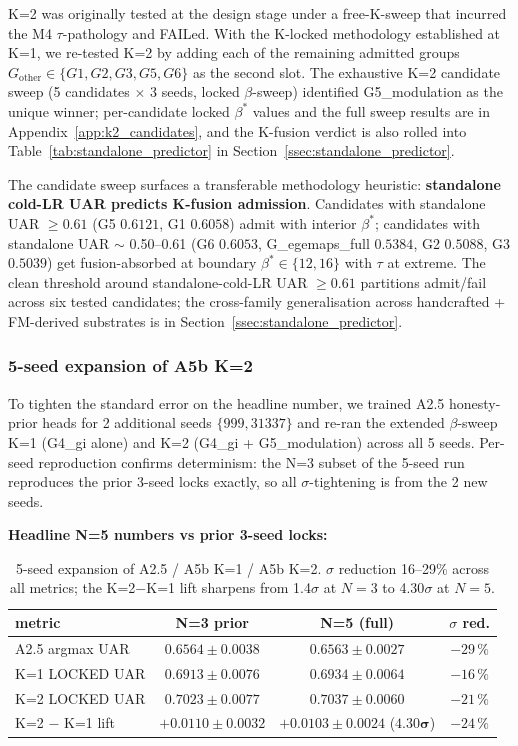 K=2 was originally tested at the design stage under a free-K-sweep that incurred the M4 $\tau$-pathology and FAILed. With the K-locked methodology established at K=1, we re-tested K=2 by adding each of the remaining admitted groups $G_{\text{other}} \in \{G1, G2, G3, G5, G6\}$ as the second slot. The exhaustive K=2 candidate sweep (5 candidates $\times$ 3 seeds, locked $\beta$-sweep) identified G5\_modulation as the unique winner; per-candidate locked $\beta^*$ values and the full sweep results are in Appendix~\ref{app:k2_candidates}, and the K-fusion verdict is also rolled into Table~\ref{tab:standalone_predictor} in Section~\ref{ssec:standalone_predictor}.

The candidate sweep surfaces a transferable methodology heuristic: \textbf{standalone cold-LR UAR predicts K-fusion admission}. Candidates with standalone UAR $\geq 0.61$ (G5 $0.6121$, G1 $0.6058$) admit with interior $\beta^*$; candidates with standalone UAR $\sim$ 0.50--0.61 (G6 $0.6053$, G\_egemaps\_full $0.5384$, G2 $0.5088$, G3 $0.5039$) get fusion-absorbed at boundary $\beta^* \in \{12, 16\}$ with $\tau$ at extreme. The clean threshold around standalone-cold-LR UAR $\geq 0.61$ partitions admit/fail across six tested candidates; the cross-family generalisation across handcrafted + FM-derived substrates is in Section~\ref{ssec:standalone_predictor}.

\subsubsection{5-seed expansion of A5b K=2}
\label{ssec:k2_5seed}

To tighten the standard error on the headline number, we trained A2.5 honesty-prior heads for 2 additional seeds $\{999, 31337\}$ and re-ran the extended $\beta$-sweep K=1 (G4\_gi alone) and K=2 (G4\_gi + G5\_modulation) across all 5 seeds. Per-seed reproduction confirms determinism: the N=3 subset of the 5-seed run reproduces the prior 3-seed locks exactly, so all $\sigma$-tightening is from the 2 new seeds.

\textbf{Headline N=5 numbers vs prior 3-seed locks:}

\begin{table}[t]
\centering\small
\caption{5-seed expansion of A2.5 / A5b K=1 / A5b K=2. $\sigma$ reduction 16--29\% across all metrics; the K=2$-$K=1 lift sharpens from 1.4$\sigma$ at $N{=}3$ to 4.30$\sigma$ at $N{=}5$.}
\label{tab:5seed}
\begin{tabular}{lccc}
\toprule
metric              & N=3 prior        & N=5 (full)        & $\sigma$ red. \\
\midrule
A2.5 argmax UAR     & $0.6564 \pm 0.0038$ & $0.6563 \pm 0.0027$ & $-29\,\%$ \\
K=1 LOCKED UAR      & $0.6913 \pm 0.0076$ & $0.6934 \pm 0.0064$ & $-16\,\%$ \\
K=2 LOCKED UAR      & $0.7023 \pm 0.0077$ & $\mathbf{0.7037 \pm 0.0060}$ & $-21\,\%$ \\
K=2 $-$ K=1 lift    & $+0.0110 \pm 0.0032$ & $+0.0103 \pm 0.0024$ ($\mathbf{4.30\sigma}$) & $-24\,\%$ \\
\bottomrule
\end{tabular}
\end{table}

